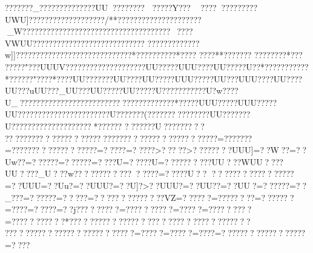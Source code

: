 {{{{{{{{{{{{{{{{{{{{{{{{{{{{{{{{{{{{{{{{{{{{{{{{{{{{{{{{{{{{{{{{{{{{{{{{{{{{{{{{{{{{{{{{{{{{{{{{{{{{{{{{{{{{{{{{{{{{{{{{{{{{{{{{{{{{{{{{{{{{{{{{{{{{{{{{{{{{{{{{{{{{{{{{{{{{{{{{{{{{{{{{{{{{{{{{{{{{{{{{{{{{{{{{{{{{{{{{{{{{{{{{{{{{{{{{{{{{{{{{{{{{{{{{{{{{{{{{{{{{{{{{{{{{{{{{{{{{{{{{{{{{{{{{{{{{{{{{{{{{{{{{{{{{{{{{{{{{{{{{{{{{{{{{{{{{{{{{{{{{{{{{{{{{{{{{{{{{{{{{{{{{{{{{{{{{{{{{{{{{{{{{{{{{{{{{{{{{{{{{{{{{{{{{{{{{{{{{{{{{{{{{{{{{{{{{{{{{{{{{{{{{{{{{{{{{{{{{{{{{{{{{{{{{{{{{{{{{{{{{{{{{{{{{{{{{{{{{{{{{{{{{{{{{{{{{{{{{{{{{{{{{{{{{{{{{{{{{{{{{{{{{{{{{{{{{{{{{{{{{{{{{{{{{{{{{{{{{{{{{{{{{{{{{{{{{{{{{{{{{{{{{{{{{{{{{{{{{{{{{{{{{{{{{{{{{{{{{{{{{{{{{{{{{{{{{{{{{{{{{{{{{{{{{{{{{{{{{{{{{{{{{{{{{{{{{{{{{{{{{{{{{{{{{{{{{{{{{{{{{{{{{{{{{{{{{{{{{{{{{{{{{{{{{{{{{{{{{{{{{{{{{{{{{{{{{{{{{{{{{{{{{{{{{{{{{{{{{{{{{{{{{{{{{{{{{{{{{{{{{{{{{{{{{{{{{{{{{{{{{{{{{{{{{{{{{{{{{{{{{{{{{{{{{{{{{{{{{{{{{{{{{{{{{{{{{{{{{{{{{{{{{{{{{{{{{{{{{{{{{{{{{{{{{{{{{{{{{{{{{{{{{{{{{{{{{{{{{{{{{{{{{{{{{{{{{{{{{{{{{{{{{{{{{{{{{{{{{{{{{{{{{{{{{{{{{{{{{{{{{{{{{{{{{{{{{{{{{{{{{{{{{{{{{{{{{{{{{{{{{{{{{{{{{{{{{{{{{{{{{{{{{{{{{{{{{{{{{{{{{{{{{{{{{{{{{{{{{{{{{{{{{{{{{{{{{{{{{{{{{{{{{{{{{{{{{{{{{{{{{{{{{{{{{{{{{{{{{{{{{{{{{{{{{{{{{{{{{{{{{{{{{{{{{{{{{{{{{{{{{{{{{{{{{{{{{{{{{{{{{{{{{{{{{{{{{{{{{{{{{{{{{{{{{{{{{{{{{{{{{{{{{{{{{{{{{{{{{{{{{{{{{{{{{{{{{{{{{{{{{{{{{{{{{{{{{{{{{{{{{{{{{{{{{{{{{{{{{{{{{{{{{{{{{{{{{{{{{{{{{{{{{{{{{{{{{{{{{{{{{{{{{{{{{{{{{{{{{{{{{{{{{{{{{{{{{{{{{{{{{{{{{{{{{{{{{{{{{{{{{{{{{{{{{{{{{{{{{{{{{{{{{{{{{{{{{{{{{{{{{{{{{{{{{{{{{{{{{{{{{{{{{{{{{{{{{{{{{{{{{{{{{{{{{{{{{{{{{{{{{{{{{{{{{{{{{{{{{{{{{{{{{{{{{{{{{{{{{{{{{{{{{{{{{{{{{{{{{{{{{{{{{{{{{{{{{{{{{{{{{{{{{{{{{{{{{{{{{{{{{{{{{{{{{{{{{{{{{{{{{{{{{{{{{{{{{{{{{{{{{{{{{{{{{{{{{{{{{{{{{{{{{{{{{{{{{{{{{{{{{{{{{{{{{{{{{{{{{{{{{{{{{{{{{{{{{{{{{{{{{{{{{{{{{{{{{{{{{{{{{{{{{{{{{{{{{{???????_???????????   ???UU??? ?????  ?????Y???
?????????????UWU]?????????    ??????????/**?????????????????????_W?????????????????????????????????????~????VWUU?????????????? ??????????????
?????}??}??????w]]????????????????????????????? *?????  ?????  *????  
????  **???   ????   ????   ????   *???   
??    ???   "???UUUV??    ??    ???   ???    ??    ??    ??    ??    ??UU?????UUU????UU?????U??*???????????*?????? "????  *????UU????   ???UU????UU?????UUU?????UU???UUU????UU????UU???uUU???_UU???UU?????UU?????U?????}??????U?w????U_??????????????????????????????? ???????   *?????UUU?????UUU?????UU?????  ??????????????????U???????(??????? ????????UU???????U????????????????????*??????  
???????U?????????
??????????????????????????????????????????????=???????=???????????????????=?????=?????>?????>????????UUU]=??W??=??Uw??=??????=??????=????}U=?????U=??????????UU???WUU????UU????_U???w????????????}?????=?????U??  ?????????????????=??UUU}=??Uu}?=??UUU?=??U]}?>??UUU?=??UU??=??UU?=??????=??_???=??????=?????=??????????????VZ=??????=???????   ?=???????=????=?????=??j?????????=??????????=?????=?????????=???????????*?????????????????????????????????????
???????????????????????????=?????=?????=????=??????????????????=???? }}}}}}}}}}}}}}}}}}}}}}}}}}}}}}}}}}}}}}}}}}}}}}}}}}}}}}}}}}}}}}}}}}}}}}}}}}}}}}}}}}}}}}}}}}}}}}}}}}}}}}}}}}}}}}}}}}}}}}}}}}}}}}}}}}}}}}}}}}}}}}}}}}}}}}}}}}}}}}}}}}}}}}}}}}}}}}}}}}}}}}}}}}}}}}}}}}}}}}}}}}}}}}}}}}}}}}}}}}}}}}}}}}}}}}}}}}}}}}}}}}}}}}}}}}}}}}}}}}}}}}}}}}}}}}}}}}}}}}}}}}}}}}}}}}}}}}}}}}}}}}}}}}}}}}}}}}}}}}}}}}}}}}}}}}}}}}}}}}}}}}}}}}}}}}}}}}}}}}}}}}}}}}}}}}}}}}}}}}}}}}}}}}}}}}}}}}}}}}}}}}}}}}}}}}}}}}}}}}}}}}}}}}}}}}}}}}}}}}}}}}}}}}}}}}}}}}}}}}}}}}}}}}}}}}}}}}}}}}}}}}}}}}}}}}}}}}}}}}}}}}}}}}}}}}}}}}}}}}}}}}}}}}}}}}}}}}}}}}}}}}}}}}}}}}}}}}}}}}}}}}}}}}}}}}}}}}}}}}}}}}}}}}}}}}}}}}}}}}}}}}}}}}}}}}}}}}}}}}}}}}}}}}}}}}}}}}}}}}}}}}}}}}}}}}}}}}}}}}}}}}}}}}}}}}}}}}}}}}}}}}}}}}}}}}}}}}}}}}}}}}}}}}}}}}}}}}}}}}}}}}}}}}}}}}}}}}}}}}}}}}}}}}}}}}}}}}}}}}}}}}}}}}}}}}}}}}}}}}}}}}}}}}}}}}}}}}}}}}}}}}}}}}}}}}}}}}}}}}}}}}}}}}}}}}}}}}}}}}}}}}}}}}}}}}}}}}}}}}}}}}}}}}}}}}}}}}}}}}}}}}}}}}}}}}}}}}}}}}}}}}}}}}}}}}}}}}}}}}}}}}}}}}}}}}}}}}}}}}}}}}}}}}}}}}}}}}}}}}}}}}}}}}}}}}}}}}}}}}}}}}}}}}}}}}}}}}}}}}}}}}}}}}}}}}}}}}}}}}}}}}}}}}}}}}}}}}}}}}}}}}}}}}}}}}}}}}}}}}}}}}}}}}}}}}}}}}}}}}}}}}}}}}}}}}}}}}}}}}}}}}}}}}}}}}}}}}}}}}}}}}}}}}}}}}}}}}}}}}}}}}}}}}}}}}}}}}}}}}}}}}}}}}}}}}}}}}}}}}}}}}}}}}}}}}}}}}}}}}}}}}}}}}}}}}}}}}}}}}}}}}}}}}}}}}}}}}}}}}}}}}}}}}}}}}}}}}}}}}}}}}}}}}}}}}}}}}}}}}}}}}}}}}}}}}}}}}}}}}}}}}}}}}}}}}}}}}}}}}}}}}}}}}}}}}}}}}}}}}}}}}}}}}}}}}}}}}}}}}}}}}}}}}}}}}}}}}}}}}}}}}}}}}}}}}}}}}}}}}}}}}}}}}}}}}}}}}}}}}}}}}}}}}}}}}}}}}}}}}}}}}}}}}}}}}}}}}}}}}}}}}}}}}}}}}}}}}}}}}}}}}}}}}}}}}}}}}}}}}}}}}}}}}}}}}}}}}}}}}}}}}}}}}}}}}}}}}}}}}}}}}}}}}}}}}}}}}}}}}}}}}}}}}}}}}}}}}}}}}}}}}}}}}}}}}}}}}}}}}}}}}}}}}}}}}}}}}}}}}}}}}}}}}}}}}}}}}}}}}}}}}}}}}}}}}}}}}}}}}}}}}}}}}}}}}}}}}}}}}}}}}}}}}}}}}}}}}}}}}}}}}}}}}}}}}}}}}}}}}}}}}}}}}}}}}}}}}}}}}}}}}}}}}}}}}}}}}}}}}}}}}}}}}}}}}}}}}}}}}}}}}}}}}}}}}}}}}}}}}}}}}}}}
